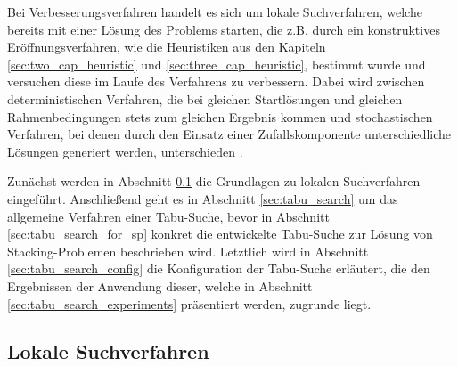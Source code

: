 Bei Verbesserungsverfahren handelt es sich um lokale Suchverfahren, welche bereits mit einer Lösung des Problems starten, die z.B. durch ein konstruktives Eröffnungsverfahren, wie die Heuristiken aus den Kapiteln \ref{sec:two_cap_heuristic} und \ref{sec:three_cap_heuristic}, bestimmt wurde und versuchen diese im Laufe des Verfahrens zu verbessern. Dabei wird zwischen deterministischen Verfahren, die bei gleichen Startlösungen und gleichen Rahmenbedingungen stets zum gleichen Ergebnis kommen und stochastischen Verfahren, bei denen durch den Einsatz einer Zufallskomponente unterschiedliche Lösungen generiert werden, unterschieden \cite{Knust2017}.

Zunächst werden in Abschnitt \ref{sec:local_search} die Grundlagen zu lokalen Suchverfahren eingeführt.
Anschließend geht es in Abschnitt \ref{sec:tabu_search} um das allgemeine Verfahren einer Tabu-Suche,
bevor in Abschnitt \ref{sec:tabu_search_for_sp} konkret die entwickelte Tabu-Suche zur Lösung von Stacking-Problemen
beschrieben wird. Letztlich wird in Abschnitt \ref{sec:tabu_search_config} die Konfiguration der Tabu-Suche erläutert,
die den Ergebnissen der Anwendung dieser, welche in Abschnitt \ref{sec:tabu_search_experiments} präsentiert werden,
zugrunde liegt.

\subsection{Lokale Suchverfahren}
\label{sec:local_search}


